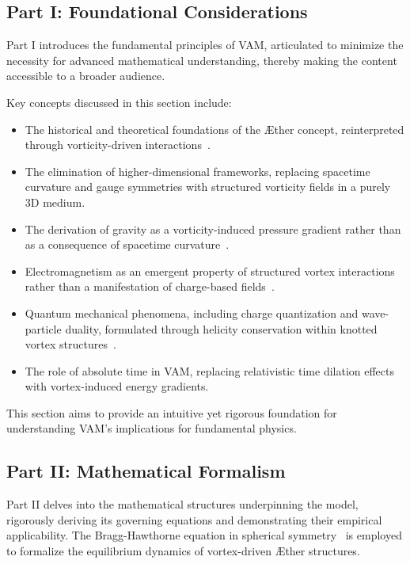 \documentclass[a4paper,10pt]{article}
\begin{document}
\subsection*{Part I: Foundational Considerations}
Part I introduces the fundamental principles of VAM, articulated to minimize the necessity for advanced mathematical understanding, thereby making the content accessible to a broader audience.

Key concepts discussed in this section include:
\begin{itemize}
    \item The historical and theoretical foundations of the Æther concept, reinterpreted through vorticity-driven interactions~\cite{young1801, maxwell1865, michelson1887}.
    \item The elimination of higher-dimensional frameworks, replacing spacetime curvature and gauge symmetries with structured vorticity fields in a purely 3D medium.
    \item The derivation of gravity as a vorticity-induced pressure gradient rather than as a consequence of spacetime curvature~\cite{einstein_1905_4}.
    \item Electromagnetism as an emergent property of structured vortex interactions rather than a manifestation of charge-based fields~\cite{Kaluza1921, Klein1926}.
    \item Quantum mechanical phenomena, including charge quantization and wave-particle duality, formulated through helicity conservation within knotted vortex structures~\cite{kleckner2016}.
    \item The role of absolute time in VAM, replacing relativistic time dilation effects with vortex-induced energy gradients.
\end{itemize}
This section aims to provide an intuitive yet rigorous foundation for understanding VAM's implications for fundamental physics.

\subsection*{Part II: Mathematical Formalism}
Part II delves into the mathematical structures underpinning the model, rigorously deriving its governing equations and demonstrating their empirical applicability. The Bragg-Hawthorne equation in spherical symmetry~\cite{keller2024} is employed to formalize the equilibrium dynamics of vortex-driven Æther structures.
\end{document}
